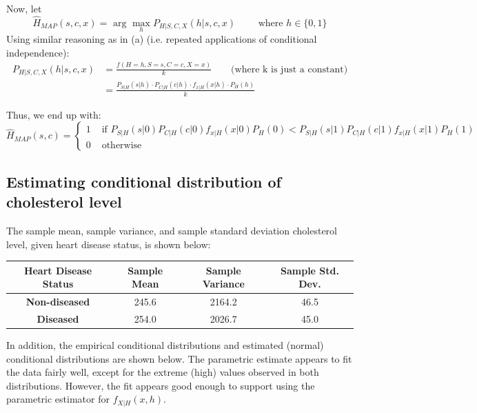 \documentclass[paper=a4, fontsize=11pt]{scrartcl} %
\numberwithin{equation}{section} %
\numberwithin{figure}{section} %
\numberwithin{table}{section} %
\begin{document}
Now, let
\[\hat{H}_{MAP}(s,c,x) = \textrm{ arg } \max_h P_{H | S,C,X}(h | s,c,x) \qquad \textrm{ where } h \in \{0,1\}\]
Using similar reasoning as in (a) (i.e. repeated applications of conditional independence):
\begin{align*}
P_{H | S,C,X}(h | s,c,x) &= \frac{f(H = h, S = s, C = c, X = x)}{k} \qquad{} \textrm{(where k is just a constant)} \\
   &= \frac{P_{S|H}(s | h) \cdot P_{C|H}(c | h) \cdot f_{x|H}(x | h) \cdot P_H(h)}{k}
\end{align*}

Thus, we end up with:
\[
\hat{H}_{MAP} (s,c) = 
\begin{cases}
1 & \textrm{ if } P_{S|H}(s | 0) P_{C|H}(c | 0) f_{x|H}(x | 0) P_H(0) < P_{S|H}(s | 1) P_{C|H}(c | 1) f_{x|H}(x | 1) P_H(1) \\
0 & \textrm{ otherwise}
\end{cases}
\]

\subsection{Estimating conditional distribution of cholesterol level}

The sample mean, sample variance, and sample standard deviation cholesterol level, given heart disease status, is shown below:

\begin{center}
\begin{tabular} { | c | c | c | c | }
\hline
\textbf{Heart Disease Status} & \textbf{Sample Mean} & \textbf{Sample Variance} & \textbf{Sample Std. Dev.} \\
\hline
\textbf{Non-diseased} & 245.6 & 2164.2 & 46.5 \\
\hline
\textbf{Diseased} & 254.0 & 2026.7 & 45.0 \\
\hline
\end{tabular}
\end{center}

In addition, the empirical conditional distributions and estimated (normal) conditional distributions are shown below. The parametric estimate appears to fit the data fairly well, except for the extreme (high) values observed in both distributions. However, the fit appears good enough to support using the parametric estimator for $f_{X | H}(x,h)$.
\end{document}
